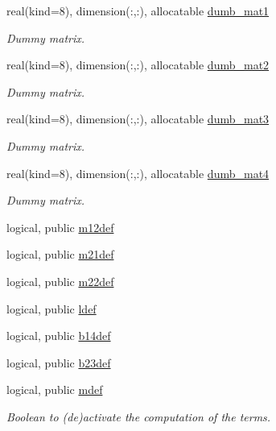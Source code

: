 \begin{DoxyCompactItemize}
real(kind=8), dimension(\+:,\+:), allocatable \hyperlink{namespacewl__tensor_a47f8f8062b343d2c40334f71b7bd7874}{dumb\+\_\+mat1}
\begin{DoxyCompactList}\small\item\em Dummy matrix. \end{DoxyCompactList}\item 
real(kind=8), dimension(\+:,\+:), allocatable \hyperlink{namespacewl__tensor_ae3b68a59db71378ea01f2cd20eb9f611}{dumb\+\_\+mat2}
\begin{DoxyCompactList}\small\item\em Dummy matrix. \end{DoxyCompactList}\item 
real(kind=8), dimension(\+:,\+:), allocatable \hyperlink{namespacewl__tensor_a489cd37af9ca5ee74e61c60c0e79830f}{dumb\+\_\+mat3}
\begin{DoxyCompactList}\small\item\em Dummy matrix. \end{DoxyCompactList}\item 
real(kind=8), dimension(\+:,\+:), allocatable \hyperlink{namespacewl__tensor_a1f1d3c5466015a2fa24afa056c19a4e3}{dumb\+\_\+mat4}
\begin{DoxyCompactList}\small\item\em Dummy matrix. \end{DoxyCompactList}\item 
logical, public \hyperlink{namespacewl__tensor_a57e045045436974aaa5559870608eb8c}{m12def}
\item 
logical, public \hyperlink{namespacewl__tensor_a73b5bff23de718d81561d53d941adb9c}{m21def}
\item 
logical, public \hyperlink{namespacewl__tensor_aeac41f836563c43a27362aa57da9bd69}{m22def}
\item 
logical, public \hyperlink{namespacewl__tensor_af8bcd8abccef10f4c6f0ef9d75fb6ab3}{ldef}
\item 
logical, public \hyperlink{namespacewl__tensor_a29f327d70916dfce23a1a2e20799227a}{b14def}
\item 
logical, public \hyperlink{namespacewl__tensor_acbe8020d8c3b634f2c677bff0937c593}{b23def}
\item 
logical, public \hyperlink{namespacewl__tensor_a3aeca3d529c65d2537167b5384a92fe0}{mdef}
\begin{DoxyCompactList}\small\item\em Boolean to (de)activate the computation of the terms. \end{DoxyCompactList}\end{DoxyCompactItemize}


